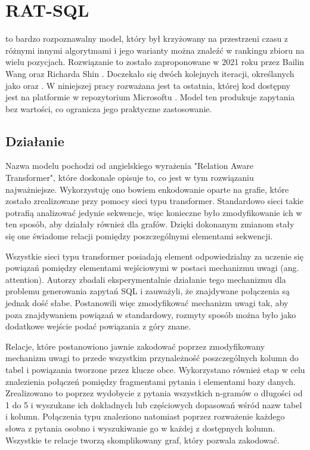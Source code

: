 \section{RAT-SQL}
 to bardzo rozpoznawalny model, który był krzyżowany na przestrzeni czasu z różnymi innymi algorytmami i jego warianty można znaleźć w rankingu zbioru  na wielu pozycjach. Rozwiązanie to zostało zaproponowane w 2021 roku przez Bailin Wang oraz Richarda Shin . Doczekało się dwóch kolejnych iteracji, określanych jako  oraz . W niniejszej pracy rozważana jest ta ostatnia, której kod dostępny jest na platformie  w repozytorium Microsoftu . Model ten produkuje zapytania bez wartości, co ogranicza jego praktyczne zastosowanie.

\subsection{Działanie}
Nazwa modelu  pochodzi od angielskiego wyrażenia "Relation Aware Transformer", które doskonale opisuje to, co jest w tym rozwiązaniu najważniejsze. Wykorzystuję ono bowiem enkodowanie oparte na grafie, które zostało zrealizowane przy pomocy sieci typu transformer. Standardowo sieci takie potrafią analizować jedynie sekwencje, więc konieczne było zmodyfikowanie ich w ten sposób, aby działały również dla grafów. Dzięki dokonanym zmianom stały się one świadome relacji pomiędzy poszczególnymi elementami sekwencji.

Wszystkie sieci typu transformer posiadają element odpowiedzialny za uczenie się powiązań pomiędzy elementami wejściowymi w postaci mechanizmu uwagi (ang. attention). Autorzy  zbadali eksperymentalnie działanie tego mechanizmu dla problemu generowania zapytań SQL i zauważyli, że znajdywane połączenia są jednak dość słabe. Postanowili więc zmodyfikować mechanizm uwagi tak, aby poza znajdywaniem powiązań w standardowy, rozmyty sposób można było jako dodatkowe wejście podać powiązania z góry znane. 

Relacje, które postanowiono jawnie zakodować poprzez zmodyfikowany mechanizm uwagi to przede wszystkim przynależność poszczególnych kolumn do tabel i powiązania tworzone przez klucze obce. Wykorzystano również etap  w celu znalezienia połączeń pomiędzy fragmentami pytania i elementami bazy danych. Zrealizowano to poprzez wydobycie z pytania wszystkich n-gramów o długości od 1 do 5 i wyszukane ich dokładnych lub częściowych dopasowań wśród nazw tabel i kolumn. Połączenia typu  znaleziono natomiast poprzez rozważenie każdego słowa z pytania osobno i wyszukiwanie go w każdej z dostępnych kolumn. Wszystkie te relacje tworzą skomplikowany graf, który  pozwala zakodować.

